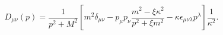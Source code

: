 \begin{equation}
D_{\mu \nu} (p) =  \frac{1}{p^2+M^2} \left[ m^2
\delta_{\mu \nu} - p_{\mu} p_{\nu} \frac{m^2 - \xi \kappa^2}{p^2 + \xi
m^2} -  \kappa \epsilon_{\mu \nu \lambda} p^{\lambda} \right]\frac{1}{\kappa^2}.\end{equation}

